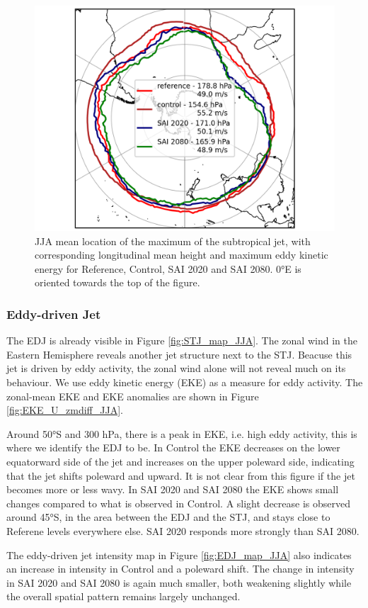 \begin{figure}[H]
	\centering
	\includegraphics[width=0.48\linewidth]{images/STJ_maxloc_JJA.png}
	\caption{JJA mean location of the maximum of the subtropical jet, with corresponding longitudinal mean height and maximum eddy kinetic energy for Reference, Control, SAI 2020 and SAI 2080. 0°E is oriented towards the top of the figure.}
	\label{fig:STJ_maxloc_JJA}
\end{figure}


\subsubsection{Eddy-driven Jet}\label{EDJ_sec}
The EDJ is already visible in Figure \ref{fig:STJ_map_JJA}. The zonal wind in the Eastern Hemisphere reveals another jet structure next to the STJ. Beacuse this jet is driven by eddy activity, the zonal wind alone will not reveal much on its behaviour. We use eddy kinetic energy (EKE) as a measure for eddy activity. The zonal-mean EKE and EKE anomalies are shown in Figure \ref{fig:EKE_U_zmdiff_JJA}.

Around 50°S and 300 hPa, there is a peak in EKE, i.e. high eddy activity, this is where we identify the EDJ to be. In Control the EKE decreases on the lower equatorward side of the jet and increases on the upper poleward side, indicating that the jet shifts poleward and upward. It is not clear from this figure if the jet becomes more or less wavy. In SAI 2020 and SAI 2080 the EKE shows small changes compared to what is observed in Control. A slight decrease is observed around 45°S, in the area between the EDJ and the STJ, and stays close to Referene levels everywhere else. SAI 2020 responds more strongly than SAI 2080.

The eddy-driven jet intensity map in Figure \ref{fig:EDJ_map_JJA} also indicates an increase in intensity in Control and a poleward shift. The change in intensity in SAI 2020 and SAI 2080 is again much smaller, both weakening slightly while the overall spatial pattern remains largely unchanged. 

